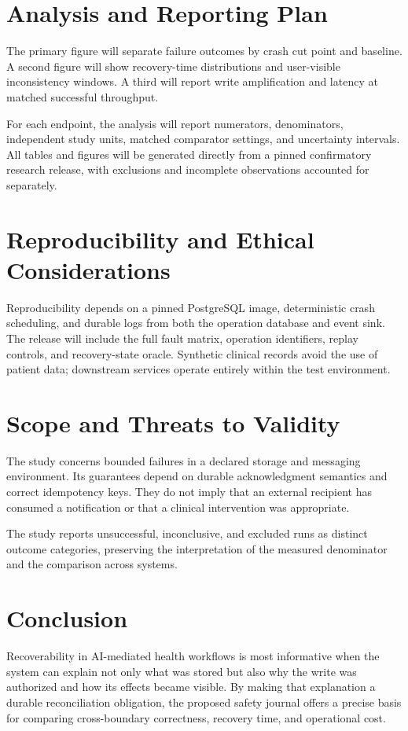 \documentclass[11pt,a4paper]{article}
\begin{document}
\section{Analysis and Reporting Plan}
The primary figure will separate failure outcomes by crash cut point and baseline. A second figure will show recovery-time distributions and user-visible inconsistency windows. A third will report write amplification and latency at matched successful throughput.

For each endpoint, the analysis will report numerators, denominators, independent study units, matched comparator settings, and uncertainty intervals. All tables and figures will be generated directly from a pinned confirmatory research release, with exclusions and incomplete observations accounted for separately.

\section{Reproducibility and Ethical Considerations}
Reproducibility depends on a pinned PostgreSQL image, deterministic crash scheduling, and durable logs from both the operation database and event sink. The release will include the full fault matrix, operation identifiers, replay controls, and recovery-state oracle. Synthetic clinical records avoid the use of patient data; downstream services operate entirely within the test environment.

\section{Scope and Threats to Validity}
The study concerns bounded failures in a declared storage and messaging environment. Its guarantees depend on durable acknowledgment semantics and correct idempotency keys. They do not imply that an external recipient has consumed a notification or that a clinical intervention was appropriate.

The study reports unsuccessful, inconclusive, and excluded runs as distinct outcome categories, preserving the interpretation of the measured denominator and the comparison across systems.

\section{Conclusion}
Recoverability in AI-mediated health workflows is most informative when the system can explain not only what was stored but also why the write was authorized and how its effects became visible. By making that explanation a durable reconciliation obligation, the proposed safety journal offers a precise basis for comparing cross-boundary correctness, recovery time, and operational cost.



\end{document}
